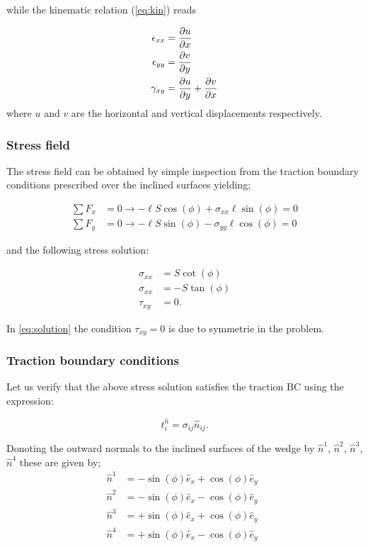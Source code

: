while the kinematic relation (\cref{eq:kin}) reads

\begin{equation}
\begin{aligned}
\epsilon_{xx}&=\pdv{u}{x}\\
\epsilon_{yy}&=\pdv{v}{y}\\
\gamma_{xy}&=\pdv{u}{y} + \pdv{v}{x}
\end{aligned}
\label{eq:strain}
\end{equation}
where $u$ and $v$ are the horizontal and vertical displacements respectively.

\subsubsection*{Stress field}

The stress field can be obtained by simple inspection from the traction boundary conditions prescribed over the inclined surfaces yielding;

\begin{align*}
\sum F_x &= 0 \longrightarrow - \ell S\cos(\phi)  + \sigma_{xx}\ell \sin(\phi) = 0\\
\sum F_y &= 0 \longrightarrow - \ell S\sin(\phi) - \sigma_{yy}\ell \cos(\phi)=0
\end{align*}

and the following stress solution:

\begin{equation}
\begin{aligned}
\sigma_{xx}& = S \cot(\phi)\\
\sigma_{xx}& = -S\tan(\phi)\\
\tau_{xy}& = 0.
\end{aligned}
\label{eq:solution}
\end{equation}

In \cref{eq:solution} the condition $\tau_{xy}=0$ is due to symmetrie in the problem.

\subsubsection*{Traction boundary conditions}
Let us verify that the above stress solution satisfies the traction BC using the expression:

\[t_i^{\hat n} = \sigma _{ij} \hat n_{ij}.\]

Donoting the outward normals to the inclined surfaces of the wedge by $\hat{n}^1$,  $\hat{n}^2$, $\hat{n}^3$, $\hat{n}^4$ these are given by;
\begin{align*}
\hat{n}^1 &= -\sin(\phi)\hat{e}_{x}+\cos(\phi)\hat{e}_{y}\\
\hat{n}^2 &= -\sin(\phi)\hat{e}_{x}-\cos(\phi)\hat{e}_{y}\\
\hat{n}^3 &= +\sin(\phi)\hat{e}_{x}+\cos(\phi)\hat{e}_{y}\\
\hat{n}^4 &= +\sin(\phi)\hat{e}_{x}-\cos(\phi)\hat{e}_{y} \enspace
\end{align*}

